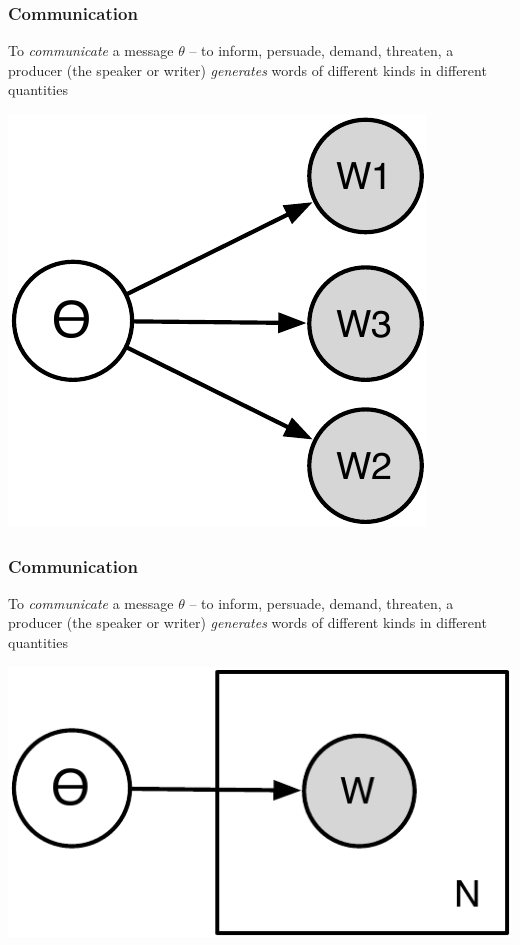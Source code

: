\documentclass[11pt,compress,professionalfonts]{beamer}
\begin{document}
\begin{frame}[t]\frametitle{Communication}

To \textsl{communicate} a message $\theta$ -- to inform, persuade, demand, threaten, a producer (the speaker or writer) \textsl{generates} words of different kinds in different quantities


\begin{center}
\includegraphics[scale=.9]{pictures/gen}
\end{center}

\end{frame}
\begin{frame}[t]\frametitle{Communication}

To \textsl{communicate} a message $\theta$ -- to inform, persuade, demand, threaten, a producer (the speaker or writer) \textsl{generates} words of different kinds in different quantities


\begin{center}
\includegraphics[scale=.9]{pictures/gen-plate}
\end{center}


\end{frame}
\end{document}
